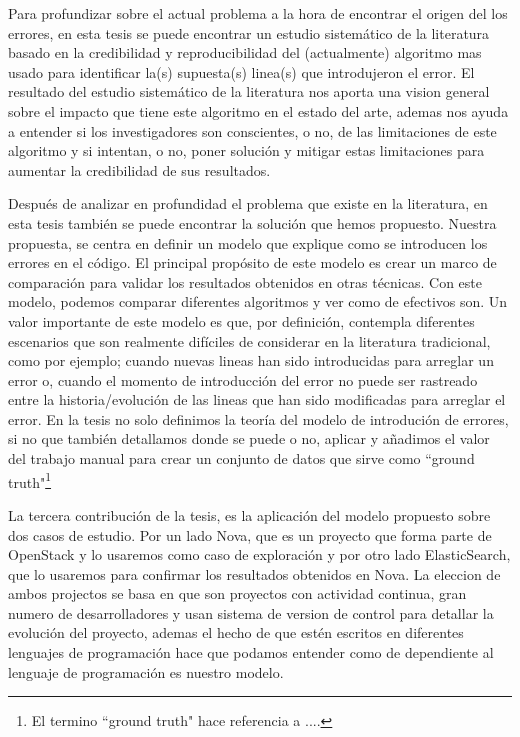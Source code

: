 \documentclass[a4paper, 12pt]{book}
\begin{document}
Para profundizar sobre el actual problema a la hora de encontrar el origen del los errores, en esta tesis se puede encontrar un estudio sistem\'atico de la literatura basado en la credibilidad y reproducibilidad del (actualmente) algoritmo mas usado para identificar la(s) supuesta(s) linea(s) que introdujeron el error. El resultado del estudio sistem\'atico de la literatura nos aporta una vision general sobre el impacto que tiene este algoritmo en el estado del arte, ademas nos ayuda a entender si los investigadores son conscientes, o no, de las limitaciones de este algoritmo y si intentan, o no, poner soluci\'on y mitigar estas limitaciones para aumentar la credibilidad de sus resultados. 

Despu\'es de analizar en profundidad el problema que existe en la literatura, en esta tesis tambi\'en se puede encontrar la soluci\'on que hemos propuesto. Nuestra propuesta, se centra en definir un modelo que explique como se introducen los errores en el c\'odigo. El principal prop\'osito de este modelo es crear un marco de comparaci\'on para validar los resultados obtenidos en otras t\'ecnicas. Con este modelo, podemos comparar diferentes algoritmos y ver como de efectivos son. Un valor importante de este modelo es que, por definici\'on, contempla diferentes escenarios que son realmente dif\'iciles de considerar en la literatura tradicional, como por ejemplo; cuando nuevas lineas han sido introducidas para arreglar un error o, cuando el momento de introducci\'on del error no puede ser rastreado entre la historia/evoluci\'on de las lineas que han sido modificadas para arreglar el error. En la tesis no solo definimos la teor\'ia del modelo de introduci\'on de errores, si no que tambi\'en detallamos donde se puede o no, aplicar y a\~nadimos el valor del trabajo manual para crear un conjunto de datos que sirve como ``ground truth"\footnote{El termino ``ground truth" hace referencia a ....}

La tercera contribuci\'on de la tesis, es la aplicaci\'on del modelo propuesto sobre dos casos de estudio. Por un lado Nova, que es un proyecto que forma parte de OpenStack y lo usaremos como caso de exploraci\'on y por otro lado ElasticSearch, que lo usaremos para confirmar los resultados obtenidos en Nova. La eleccion de ambos projectos se basa en que son proyectos con actividad continua, gran numero de desarrolladores y usan sistema de version de control para detallar la evoluci\'on del proyecto, ademas el hecho de que est\'en escritos en diferentes lenguajes de programaci\'on hace que podamos entender como de dependiente al lenguaje de programaci\'on es nuestro modelo.
\end{document}
